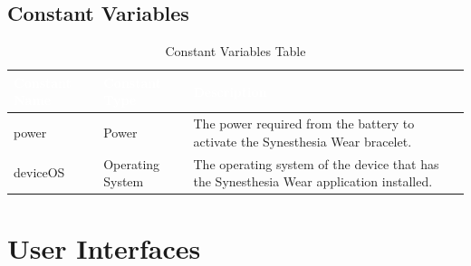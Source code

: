 \documentclass[12pt, titlepage]{article}
\begin{document}
\subsection{Constant Variables}
\begin{table}[H]
  \centering
  \label{table:ConstantVar Table} 
  \begin{tabular}{|p{5cm}|p{5cm}|p{5cm}|} 
  \hline
  \rowcolor[rgb]{0.071,0.49,0.698} \textcolor{white}{Constant Name} & \textcolor{white}{Constant Type} & \textcolor{white}{Description}                                          \\ 
  \hline
  \rowcolor[rgb]{0.675,0.827,0.902}    power     & Power &  The power required from the battery to activate the Synesthesia Wear bracelet. \\
  \hline
  \rowcolor[rgb]{0.675,0.827,0.902}    deviceOS     & Operating System &  The operating system of the device that has the Synesthesia Wear application installed. \\
  \hline
  \end{tabular}
  \caption{Constant Variables Table}
\end{table}

\section{User Interfaces}
\end{document}
